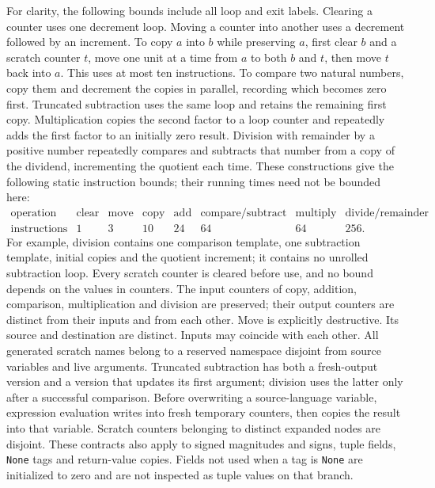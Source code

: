 For clarity, the following bounds include all loop and exit labels.
Clearing a counter uses one decrement loop. Moving a counter into
another uses a decrement followed by an increment. To copy $a$ into
$b$ while preserving $a$, first clear $b$ and a scratch counter $t$,
move one unit at a time from $a$ to both $b$ and $t$, then move $t$
back into $a$. This uses at most ten instructions. To compare two
natural numbers, copy them and decrement the copies in parallel,
recording which becomes zero first. Truncated subtraction uses the
same loop and retains the remaining first copy. Multiplication
copies the second factor to a loop counter and repeatedly adds the
first factor to an initially zero result. Division with remainder
by a positive number repeatedly compares and subtracts that number
from a copy of the dividend, incrementing the quotient each time.
These constructions give the following static instruction bounds;
their running times need not be bounded here:
\[
\begin{array}{c|rrrrrrr}
\text{operation}&\text{clear}&\text{move}&\text{copy}&\text{add}
 &\text{compare/subtract}&\text{multiply}&\text{divide/remainder}\\
\hline
\text{instructions}&1&3&10&24&64&64&256.
\end{array}
\]
For example, division contains one comparison template, one
subtraction template, initial copies and the quotient increment;
it contains no unrolled subtraction loop. Every scratch counter is
cleared before use, and no bound depends on the values in counters.
The input counters of copy, addition, comparison, multiplication and
division are preserved; their output counters are distinct from
their inputs and from each other. Move is explicitly destructive.
Its source and destination are distinct. Inputs may coincide with
each other. All generated scratch names belong to a reserved
namespace disjoint from source variables and live arguments.
Truncated subtraction has both a fresh-output version and a version
that updates its first argument; division uses the latter only
after a successful comparison. Before overwriting a source-language
variable, expression evaluation writes into fresh temporary
counters, then copies the result into that variable. Scratch
counters belonging to distinct expanded nodes are disjoint. These
contracts also apply to signed magnitudes and signs, tuple fields,
\texttt{None} tags and return-value copies. Fields not used when a
tag is \texttt{None} are initialized to zero and are not inspected
as tuple values on that branch.

